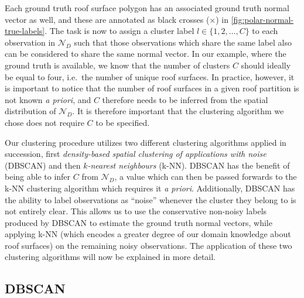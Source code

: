 Each ground truth roof surface polygon has an associated ground truth normal vector as well, and these are annotated as black crosses ($\times$) in \cref{fig:polar-normal-true-labels}.
The task is now to assign a cluster label $l \in \{1, 2, \ldots, C\}$ to each observation in $\mathcal{N}_D$ such that those observations which share the same label also can be considered to share the same normal vector.
In our example, where the ground truth is available, we know that the number of clusters $C$ should ideally be equal to four, i.e.\ the number of unique roof surfaces.
In practice, however, it is important to notice that the number of roof surfaces in a given roof partition is not known \textit{a priori}, and $C$ therefore needs to be inferred from the spatial distribution of $\mathcal{N}_{D}$.
It is therefore important that the clustering algorithm we chose does not require $C$ to be specified.

Our clustering procedure utilizes two different clustering algorithms applied in succession, first \textit{density-based spatial clustering of applications with noise} (DBSCAN) and then \textit{$k$-nearest neighbours} (k-NN).
DBSCAN has the benefit of being able to infer $C$ from $\mathcal{N}_D$, a value which can then be passed forwards to the k-NN clustering algorithm which requires it \textit{a priori}.
Additionally, DBSCAN has the ability to label observations as \enquote{noise} whenever the cluster they belong to is not entirely clear.
This allows us to use the conservative non-noisy labels produced by DBSCAN to estimate the ground truth normal vectors, while applying k-NN (which encodes a greater degree of our domain knowledge about roof surfaces) on the remaining noisy observations.
The application of these two clustering algorithms will now be explained in more detail.

\subsection{DBSCAN}

